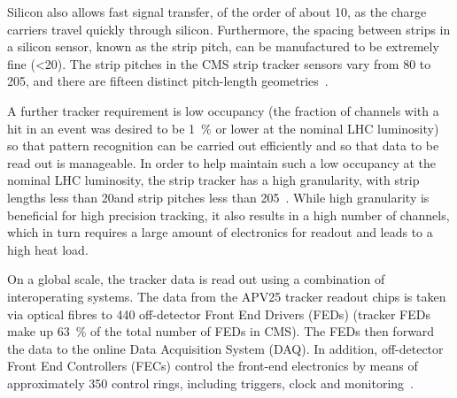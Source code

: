 Silicon also allows fast signal transfer, of the order of about 10\ns, as the charge carriers travel quickly
through silicon. Furthermore, the spacing between strips in a silicon sensor, known as the strip pitch, can be
manufactured to be extremely fine (<20\um). The strip pitches in the CMS strip tracker sensors vary from 80\um
to 205\um, and there are fifteen distinct pitch-length
geometries~\cite{Commissioning_and_Performance_Strip_Tracker}.

A further tracker requirement is low occupancy (the fraction of channels with a hit in an event was desired to
be 1~\% or lower at the nominal LHC luminosity) so that pattern recognition can be carried out efficiently and
so that data to be read out is manageable. In order to help maintain such a low occupancy at the nominal LHC
luminosity, the strip tracker has a high granularity, with strip lengths less than 20\cm and strip pitches
less than 205\um~\cite{Palmonari:1260970}. While high granularity is beneficial for high precision tracking,
it also results in a high number of channels, which in turn requires a large amount of electronics for readout
and leads to a high heat load.

On a global scale, the tracker data is read out using a combination of interoperating systems.
The data from the APV25 tracker readout chips is taken via optical fibres to 440 off-detector Front End
Drivers (FEDs) (tracker FEDs make up 63~\% of the total number of FEDs in CMS).
The FEDs then forward the data to the online Data Acquisition System (DAQ). In addition, off-detector Front
End Controllers (FECs) control the front-end electronics by means of approximately 350 control rings,
including triggers, clock and monitoring~\cite{CMS_experiment, Corrin}.


